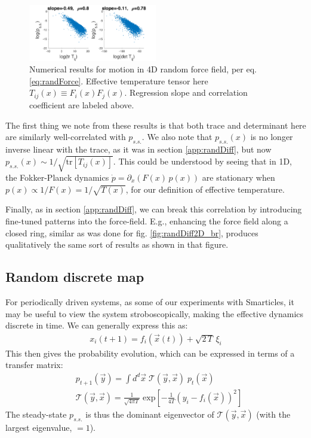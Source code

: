 \documentclass[reprint,prx]{revtex4-1}
\newcommand{\tr}{\mbox{tr}}
\renewcommand{\=}[1]{\stackrel{#1}{=}} %
\renewcommand{\(}{\left (}
\renewcommand{\)}{\right  )}
\renewcommand{\[}{\left [}
\renewcommand{\]}{\right ]}
\newcommand{\<}{\left <}
\renewcommand{\>}{\right >}
\theoremstyle{definition}
\theoremstyle{remark}
\newcommand{\e}[1]{\mbox{e}^{#1}} %
\renewcommand{\exp}[1]{\mbox{exp}\[#1\]} %
\begin{document}
\begin{figure}
	\includegraphics[width=0.5\textwidth]{randForce4D_p4.pdf}
	\caption{Numerical results for motion in 4D random force field, per eq.\ref{eq:randForce}. Effective temperature tensor here $ T_{ij}(x) \equiv F_i(x)F_j(x) $. Regression slope and correlation coefficient are labeled above. \label{fig:randForce}}
\end{figure}

The first thing we note from these results is that both trace and determinant here are similarly well-correlated with $ p_{s.s.} $. We also note that $ p_{s.s.}(x) $ is no longer inverse linear with the trace, as it was in section \ref{app:randDiff}, but now $ p_{s.s.}(x) \sim 1/\sqrt{\tr\[T_{ij}(x)\]} $. This could be understood by seeing that in 1D, the Fokker-Planck dynamics $\dot{p}= \partial_x(F(x)\,p(x)) $ are stationary when $ p(x) \propto 1/F(x) = 1/\sqrt{T(x)} $, for our definition of effective temperature. 

Finally, as in section \ref{app:randDiff}, we can break this correlation by introducing fine-tuned patterns into the force-field. E.g., enhancing the force field along a closed ring, similar as was done for fig. \ref{fig:randDiff2D_br}, produces qualitatively the same sort of results as shown in that figure. 

\subsection{Random discrete map}

For periodically driven systems, as some of our experiments with Smarticles, it may be useful to view the system stroboscopically, making the effective dynamics discrete in time. We can generally express this as:
\begin{align}
x_i(t+1)=f_i(\vec{x}(t)) + \sqrt{2\,T}\,\xi_i
\end{align}
This then gives the probability evolution, which can be expressed in terms of a transfer matrix: 
\begin{align*}
&p_{t+1}(\vec{y})= \int d^d \vec{x} \;\mathcal{T}(\vec{y},\vec{x})\; p_{t}(\vec{x})\\
&\mathcal{T}(\vec{y},\vec{x}) = \frac{1}{\sqrt{4\pi T}} \; \exp{- \frac{1}{4T}\(y_i - f_i(\vec{x})\)^2}
\end{align*}
The steady-state $ p_{s.s.} $ is thus the dominant eigenvector of $ \mathcal{T}(\vec{y},\vec{x}) $ (with the largest eigenvalue, $ =1 $).
\end{document}
